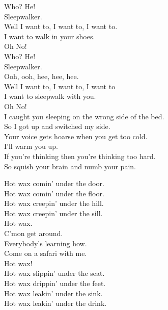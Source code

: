 


Who? He! \\
Sleepwalker. \\
Well I want to, I want to, I want to. \\
I want to walk in your shoes. \\
Oh No! \\

Who? He! \\
Sleepwalker. \\
Ooh, ooh, hee, hee, hee. \\
Well I want to, I want to, I want to \\
I want to sleepwalk with you. \\
Oh No! \\

I caught you sleeping on the wrong side of the bed. \\
So I got up and switched my side. \\
Your voice gets hoarse when you get too cold. \\
I'll warm you up. \\
If you're thinking then you're thinking too hard. \\
So squish your brain and numb your pain. \\




Hot wax comin' under the door. \\
Hot wax comin' under the floor. \\
Hot wax creepin' under the hill. \\
Hot wax creepin' under the sill. \\

Hot wax. \\
C'mon get around. \\
Everybody's learning how. \\
Come on a safari with me. \\

Hot wax! \\
Hot wax slippin' under the seat. \\
Hot wax drippin' under the feet. \\
Hot wax leakin' under the sink. \\
Hot wax leakin' under the drink. \\

